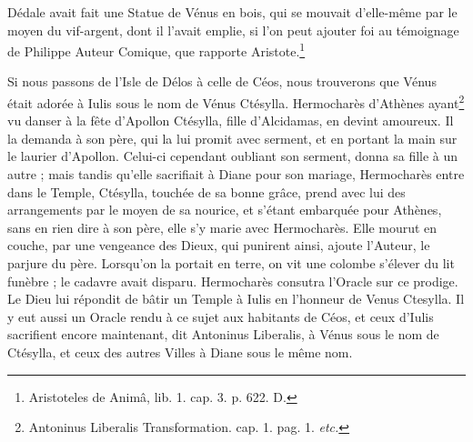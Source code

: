 \documentclass[a4paper, 18pt, oneside]{article}
\begin{document}
Dédale avait fait une Statue de Vénus en bois, qui se mouvait d'elle-même par le moyen du vif-argent, dont il l'avait emplie, si l'on peut ajouter foi au témoignage de Philippe Auteur Comique, que rapporte Aristote.\footnote{Aristoteles de Animâ, lib. 1. cap. 3. p. 622. D.}

Si nous passons de l'Isle de Délos à celle de Céos, nous trouverons que Vénus était adorée à Iulis sous le nom de Vénus Ctésylla. Hermocharès d'Athènes ayant\footnote{Antoninus Liberalis Transformation. cap. 1. pag. 1. \emph{etc.}} vu danser à la fête d'Apollon Ctésylla, fille d'Alcidamas, en devint amoureux. Il la demanda à son père, qui la lui promit avec serment, et en portant la main sur le laurier d'Apollon. Celui-ci cependant oubliant son serment, donna sa fille à un autre ; mais tandis qu'elle sacrifiait à Diane pour son mariage, Hermocharès entre dans le Temple, Ctésylla, touchée de sa bonne grâce, prend avec lui des arrangements par le moyen de sa nourice, et s'étant embarquée pour Athènes, sans en rien dire à son père, elle s'y marie avec Hermocharès. Elle mourut en couche, par une vengeance des Dieux, qui punirent ainsi, ajoute l'Auteur, le parjure du père. Lorsqu'on la portait en terre, on vit une colombe s'élever du lit funèbre ; le cadavre avait disparu. Hermocharès consutra l'Oracle sur ce prodige. Le Dieu lui répondit de bâtir un Temple à Iulis en l'honneur de Venus Ctesylla. Il y eut aussi un Oracle rendu à ce sujet aux habitants de Céos, et ceux d'Iulis sacrifient encore maintenant, dit Antoninus Liberalis, à Vénus sous le nom de Ctésylla, et ceux des autres Villes à Diane sous le même nom.
\end{document}
